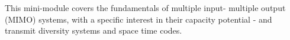 This mini-module covers the fundamentals of multiple input- multiple output (MIMO) systems, with a specific interest in their capacity potential - and transmit diversity systems and space time codes.

